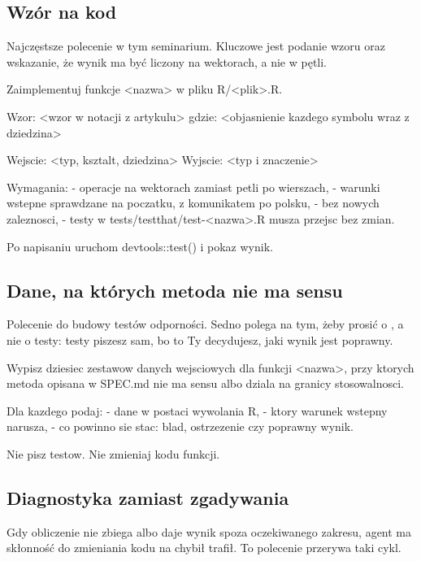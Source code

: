 \subsection{Wzór na kod}

Najczęstsze polecenie w tym seminarium. Kluczowe jest podanie wzoru  oraz wskazanie, że wynik ma być liczony na wektorach, a nie w pętli.

\begin{zapis}
Zaimplementuj funkcje <nazwa> w pliku R/<plik>.R.

Wzor:
  <wzor w notacji z artykulu>
gdzie:
  <objasnienie kazdego symbolu wraz z dziedzina>

Wejscie: <typ, ksztalt, dziedzina>
Wyjscie: <typ i znaczenie>

Wymagania:
- operacje na wektorach zamiast petli po wierszach,
- warunki wstepne sprawdzane na poczatku, z komunikatem po polsku,
- bez nowych zaleznosci,
- testy w tests/testthat/test-<nazwa>.R musza przejsc bez zmian.

Po napisaniu uruchom devtools::test() i pokaz wynik.
\end{zapis}

\subsection{Dane, na których metoda nie ma sensu}

Polecenie do budowy testów odporności. Sedno polega na tym, żeby prosić o , a nie o testy: testy piszesz sam, bo to Ty decydujesz, jaki wynik jest poprawny.

\begin{zapis}
Wypisz dziesiec zestawow danych wejsciowych dla funkcji <nazwa>, przy ktorych
metoda opisana w SPEC.md nie ma sensu albo dziala na granicy stosowalnosci.

Dla kazdego podaj:
- dane w postaci wywolania R,
- ktory warunek wstepny narusza,
- co powinno sie stac: blad, ostrzezenie czy poprawny wynik.

Nie pisz testow. Nie zmieniaj kodu funkcji.
\end{zapis}

\subsection{Diagnostyka zamiast zgadywania}

Gdy obliczenie nie zbiega albo daje wynik spoza oczekiwanego zakresu, agent ma skłonność do zmieniania kodu na chybił trafił. To polecenie przerywa taki cykl.

